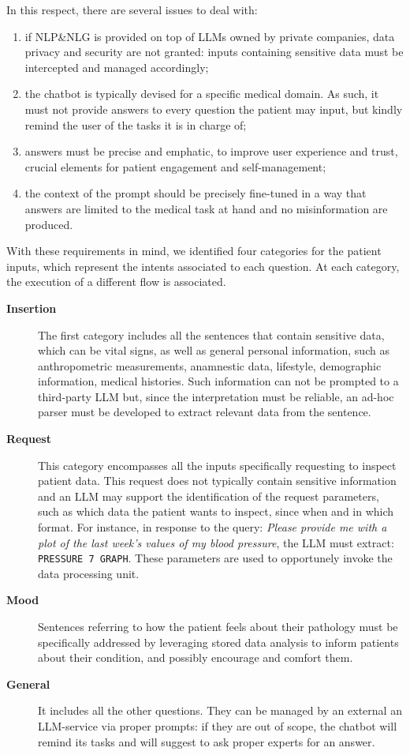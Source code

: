 In this respect, there are several issues to deal with:
\begin{enumerate}
    \item if NLP\&NLG is provided on top of LLMs owned by private companies, data privacy and security are not granted: inputs containing sensitive data must be intercepted and managed accordingly;
    \item the chatbot is typically devised for a specific medical domain. As such, it must not provide answers to every question the patient may input, but kindly remind the user of the tasks it is in charge of;
    \item answers must be precise and emphatic, to improve user experience and trust, crucial elements for patient engagement and self-management;
    \item the context of the prompt should be precisely fine-tuned in a way that answers are limited to the medical task at hand and no misinformation are produced.
\end{enumerate}
%
\noindent With these requirements in mind, we identified four categories for the patient inputs, which represent the intents associated to each question. At each category, the execution of a different flow is associated.
%
\begin{description}  
    \item[\textbf{Insertion}] The first category includes all the sentences that contain sensitive data, which can be vital signs, as well as general personal information, such as anthropometric measurements, anamnestic data, lifestyle, demographic information, medical histories. 
    Such information can not be prompted to a third-party LLM but, since the interpretation must be reliable, an ad-hoc parser must be developed to extract relevant data from the sentence.
    \item[\textbf{Request}] This category encompasses all the inputs specifically requesting to inspect patient data. 
    This request does not typically contain sensitive information and an LLM may support the identification of the request parameters, 
    such as which data the patient wants to inspect, since when and in which format. For instance, in response to the query: \emph{Please provide me with a plot of the last week's values of my blood pressure}, the LLM must extract: \texttt{PRESSURE 7 GRAPH}. These parameters are used to opportunely invoke the data processing unit.
    \item[\textbf{Mood}] Sentences referring to how the patient feels about their pathology must be specifically addressed by leveraging stored data analysis to inform patients about their condition, and possibly encourage and comfort them.
    \item[\textbf{General}] It includes all the other questions. They can be managed by an external an LLM-service via proper prompts: if they are out of scope, the chatbot will remind its tasks and will suggest to ask proper experts for an answer. 
\end{description}

